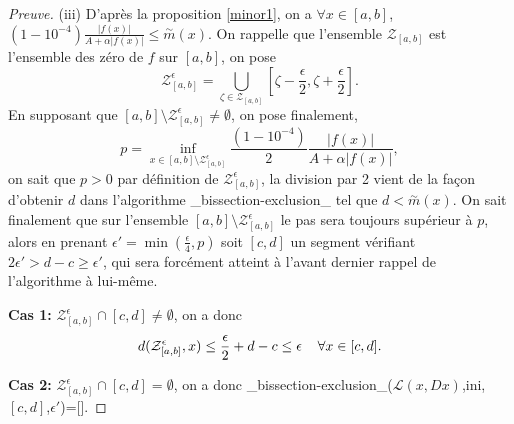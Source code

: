 \documentclass[a4paper,10pt]{article}
\begin{document}
\begin{proof}[Preuve]
		(iii) D'après la proposition \ref{minor1}, on a $\forall x \in [a,b]$, $(1-10^{-4})\frac{|f(x)|}{A+\alpha|f(x)|} \leq \overset{\sim}{m}(x)$. 
		On rappelle que l'ensemble $\mathcal{Z}_{[a,b]}$ est l'ensemble des zéro de $f$ sur $[a,b]$, on pose 
		\[\mathcal{Z}_{[a,b]}^{\epsilon}=\bigcup_{\zeta \in \mathcal{Z}_{[a,b]}}[\zeta-\frac{\epsilon}{2},\zeta+\frac{\epsilon}{2}].\]
		En supposant que $[a,b]\setminus \mathcal{Z}_{[a,b]}^{\epsilon} \neq \emptyset$, on pose finalement,
		\[p=\inf_{x\in[a,b]\setminus \mathcal{Z}_{[a,b]}^{\epsilon}} \frac{(1-10^{-4})}{2}\frac{|f(x)|}{A+\alpha|f(x)|},\]
		on sait que $p>0$ par définition de $\mathcal{Z}_{[a,b]}^{\epsilon}$, la division par 2 vient de la façon d'obtenir $d$ dans l'algorithme \_bissection-exclusion\_ tel que $d<\overset{\sim}{m}(x)$. On sait finalement que sur l'ensemble $[a,b]\setminus \mathcal{Z}_{[a,b]}^{\epsilon}$ le pas sera toujours supérieur à $p$, alors en prenant $\epsilon'=\min(\frac{\epsilon}{4},p)$
		soit $[c,d]$ un segment vérifiant $2\epsilon'>d-c\geq\epsilon'$, qui sera forcément atteint à l'avant dernier rappel de l'algorithme à lui-même.
		
		\vspace{1mm}
		
		\noindent\textbf{Cas 1:} $\mathcal{Z}_{[a,b]}^{\epsilon} \cap [c,d] \neq \emptyset$, on a donc
		\[d(\mathcal{Z}_{[a,b]}^{\epsilon},x)\leq\frac{\epsilon}{2}+d-c\leq\epsilon \hspace{4mm} \forall x \in [c,d].\]
		
		\vspace{1mm}
		
		\noindent\textbf{Cas 2:}  $\mathcal{Z}_{[a,b]}^{\epsilon} \cap [c,d] = \emptyset$, on a donc \_bissection-exclusion\_($\mathcal{L}(x,Dx)$,ini,$[c,d]$,$\epsilon'$)=[].
		
	\end{proof}
\end{document}
